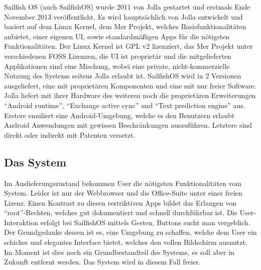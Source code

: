 Sailfish OS (auch \mbox{SailfishOS}) wurde 2011 von Jolla gestartet und erstmals Ende November 2013\thinspace\cite{online:jolla-about} veröffentlicht. Es wird hauptsächlich von Jolla entwickelt und basiert auf dem Linux Kernel, dem Mer Projekt, welches Basisfunktionalitäten anbietet, einer eigenen UI, sowie standardmäßigen Apps für die nötigsten Funktionalitäten\thinspace\cite{online:sailfish-about}. Der Linux Kernel ist GPL v2 lizenziert\thinspace\cite{online:kernel-license}, das Mer Projekt unter verschiedenen FOSS Lizenzen\thinspace\cite{online:mer-license}, die UI ist proprietär und die mitgelieferten Applikationen sind eine Mischung\thinspace\cite{online:sailfish-about}, wobei eine private, \mbox{nicht-kommerzielle} Nutzung des Systems seitens Jolla erlaubt ist\thinspace\cite{online:sailfish-eula}. \mbox{SailfishOS} wird in 2 Versionen ausgeliefert, eine mit proprietären Komponenten und eine mit nur freier Software. Jolla liefert mit ihrer Hardware des weiteren noch die proprietären Erweiterungen\thinspace\cite{online:sailfish-about} ``Android runtime''\thinspace\cite{online:sailfish-android-runtime-licensor}, ``Exchange active sync''\thinspace\cite{online:microsoft-eas} und ``Text prediction engine''\thinspace\cite{online:jolla-xt9}\thinspace\cite{online:xt9-license} aus. Erstere emuliert eine \mbox{Android-Umgebung}, welche es den Benutzern erlaubt Android Anwendungen mit gewissen Beschränkungen auszuführen\thinspace\cite{online:sailfish-android-runtime}. Letztere sind direkt oder indirekt mit Patenten versetzt.
\newline

\subsection{Das System}
Im Auslieferungszustand bekommen User die nötigsten Funktionalitäten vom System. Leider ist nur der Webbrowser und die \mbox{Office-Suite} unter einer freien Lizenz\thinspace\cite{online:sailfish-about}. Einen Kontrast zu diesen restriktiven Apps bildet das Erlangen von \mbox{``root''-Rechten}, welches gut dokumentiert und schnell durchführbar ist\thinspace\cite{online:sailfish-root}. Die User-Interaktion erfolgt bei \mbox{SailfishOS} mittels Gesten, Buttons sucht man vergeblich. Der Grundgedanke dessen ist es, eine Umgebung zu schaffen, welche dem User ein schickes und elegantes Interface bietet, welches den vollen Bildschirm ausnutzt\thinspace\cite{online:sailfish-ui}. Im Moment ist dies noch ein Grundbestandteil des Systems, es soll aber in Zukunft entfernt werden\thinspace\cite{online:sailfish-about}. Das System wird in diesem Fall freier. 

